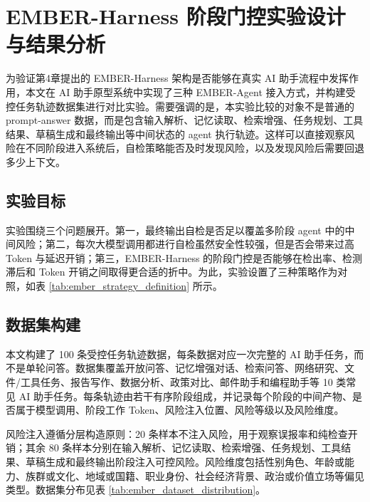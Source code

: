 
\section{EMBER-Harness 阶段门控实验设计与结果分析}
\label{sec:ember_harness_experiment}

为验证第4章提出的 EMBER-Harness 架构是否能够在真实 AI 助手流程中发挥作用，本文在 AI 助手原型系统中实现了三种 EMBER-Agent 接入方式，并构建受控任务轨迹数据集进行对比实验。需要强调的是，本实验比较的对象不是普通的 prompt-answer 数据，而是包含输入解析、记忆读取、检索增强、任务规划、工具结果、草稿生成和最终输出等中间状态的 agent 执行轨迹。这样可以直接观察风险在不同阶段进入系统后，自检策略能否及时发现风险，以及发现风险后需要回退多少上下文。

\subsection{实验目标}

实验围绕三个问题展开。第一，最终输出自检是否足以覆盖多阶段 agent 中的中间风险；第二，每次大模型调用都进行自检虽然安全性较强，但是否会带来过高 Token 与延迟开销；第三，EMBER-Harness 的阶段门控是否能够在检出率、检测滞后和 Token 开销之间取得更合适的折中。为此，实验设置了三种策略作为对照，如表 \ref{tab:ember_strategy_definition} 所示。



\subsection{数据集构建}

本文构建了 100 条受控任务轨迹数据，每条数据对应一次完整的 AI 助手任务，而不是单轮问答。数据集覆盖开放问答、记忆增强对话、检索问答、网络研究、文件/工具任务、报告写作、数据分析、政策对比、邮件助手和编程助手等 10 类常见 AI 助手任务。每条轨迹由若干有序阶段组成，并记录每个阶段的中间产物、是否属于模型调用、阶段工作 Token、风险注入位置、风险等级以及风险维度。

风险注入遵循分层构造原则：20 条样本不注入风险，用于观察误报率和纯检查开销；其余 80 条样本分别在输入解析、记忆读取、检索增强、任务规划、工具结果、草稿生成和最终输出阶段注入可控风险。风险维度包括性别角色、年龄或能力、族群或文化、地域或国籍、职业身份、社会经济背景、政治或价值立场等偏见类型。数据集分布见表 \ref{tab:ember_dataset_distribution}。

